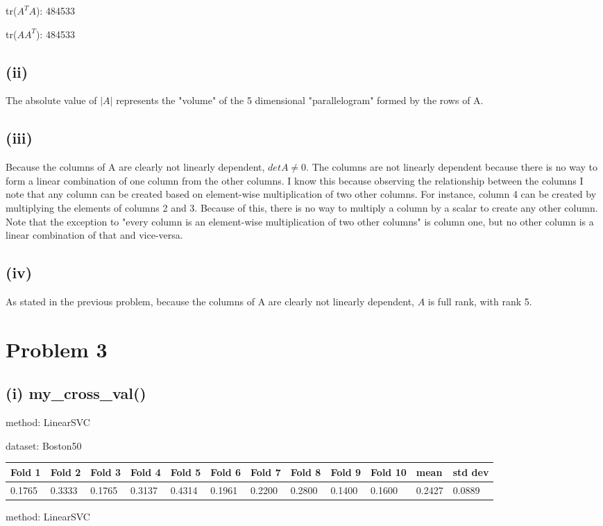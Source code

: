 \documentclass{article}
\begin{document}
\noindent tr($A^TA$): 484533

\noindent tr($AA^T$): 484533

\subsection{(ii)}

The absolute value of $|A|$ represents the "volume" of the 5 dimensional "parallelogram" formed by the rows of A.

\subsection{(iii)}

Because the columns of A are clearly not linearly dependent, $det A \neq 0$.  The columns are not linearly dependent because there is no way to form a linear combination of one column from the other columns.  I know this because observing the relationship between the columns I note that any column can be created based on element-wise multiplication of two other columns.  For instance, column 4 can be created by multiplying the elements of columns 2 and 3.  Because of this, there is no way to multiply a column by a scalar to create any other column.  Note that the exception to "every column is an element-wise multiplication of two other columns" is column one, but no other column is a linear combination of that and vice-versa.

\subsection{(iv)}

As stated in the previous problem, because the columns of A are clearly not linearly dependent, $A$ is full rank, with rank 5.

\section{Problem 3}


\subsection{(i) my\_cross\_val()}

\noindent method: LinearSVC

\noindent dataset: Boston50

\begin{center}
	\begin{tabular}  { | l | l | l | l | l | l | l | l | l | l | l | l | }
	\hline
	Fold 1 & Fold 2 & Fold 3 & Fold 4 & Fold 5 & Fold 6 & Fold 7 & Fold 8 & Fold 9 & Fold 10 & mean & std dev\\ \hline
	0.1765 & 0.3333 & 0.1765 & 0.3137 & 0.4314 & 0.1961 & 0.2200 & 0.2800 & 0.1400 & 0.1600 & 0.2427 & 0.0889\\
	\hline
	\end{tabular}
\end{center}
\noindent method: LinearSVC
\end{document}
